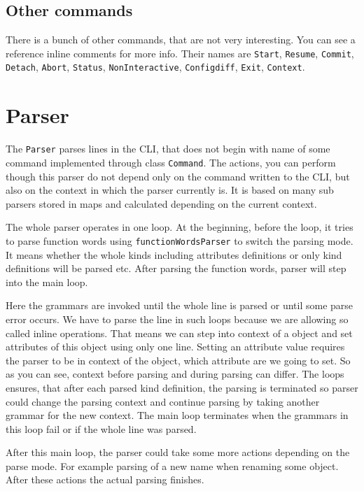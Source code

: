 \documentclass[deska]{subfiles}
\begin{document}
\subsection{Other commands}

There is a bunch of other commands, that are not very interesting. You can see a reference inline comments for more info.
Their names are {\tt Start}, {\tt Resume}, {\tt Commit}, {\tt Detach}, {\tt Abort}, {\tt Status}, {\tt NonInteractive},
{\tt Configdiff}, {\tt Exit}, {\tt Context}.

\section{Parser}

The {\tt Parser} parses lines in the CLI, that does not begin with name of some command implemented through class {\tt Command}.
The actions, you can perform though this parser do not depend only on the command written to the CLI, but also on the
context in which the parser currently is. It is based on many sub parsers stored in maps and calculated depending on the current context.

The whole parser operates in one loop. At the beginning, before the loop, it tries to parse function words using
{\tt functionWordsParser} to switch the parsing mode. It means whether the whole kinds including attributes definitions
or only kind definitions will be parsed etc. After parsing the function words, parser will step into the main loop.

Here the grammars are invoked until the whole line is parsed or until some parse error occurs. We have to parse
the line in such loops because we are allowing so called inline operations. That means we can step into context of
a object and set attributes of this object using only one line. Setting an attribute value requires the parser to
be in context of the object, which attribute are we going to set. So as you can see, context before parsing and
during parsing can differ. The loops ensures, that after each parsed kind definition, the parsing is terminated so
parser could change the parsing context and continue parsing by taking another grammar for the new context.
The main loop terminates when the grammars in this loop fail or if the whole line was parsed.

After this main loop, the parser could take some more actions depending on the parse mode. For example parsing of
a new name when renaming some object. After these actions the actual parsing finishes.
\end{document}
